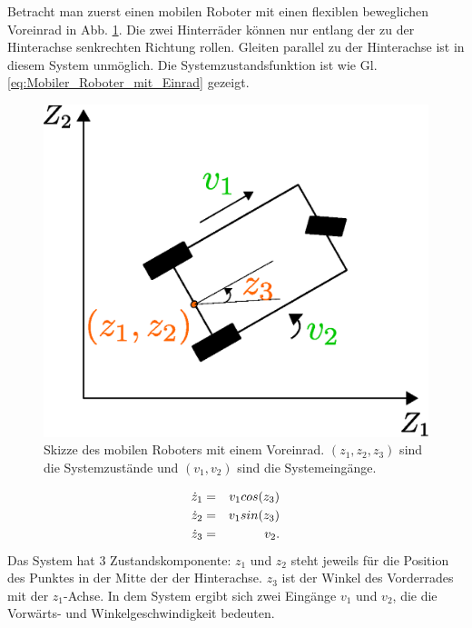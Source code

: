 \begin{beispiel}\label{bp:Brocketts_Doppelintegrator}
	Betracht man zuerst einen mobilen Roboter mit einen flexiblen beweglichen Voreinrad in Abb. \ref{fig:Brocketts_Doppelintegrator}. Die zwei Hinterräder können nur entlang der zu der Hinterachse senkrechten Richtung rollen. Gleiten parallel zu der Hinterachse ist in diesem System unmöglich. Die Systemzustandsfunktion ist wie Gl. \eqref{eq:Mobiler_Roboter_mit_Einrad} gezeigt.
	\begin{figure}[!h]
		\centering
		\includegraphics[width=0.4\linewidth]{bild/modul/Brocketts_Beispiel.eps}%
		\caption[Skizze des mobilen Roboters mit einem Voreinrad.]{Skizze des mobilen Roboters mit einem Voreinrad. $(z_{1}, z_{2},z_{3})$ sind die Systemzustände und $(v_{1},v_{2})$ sind die Systemeingänge.}
		\label{fig:Brocketts_Doppelintegrator}
	\end{figure}  
	\begin{eqnarray}
	\dot{z}_{1} &=& v_{1}cos(z_{3})\notag\\
	\dot{z}_{2} &=& v_{1}sin(z_{3})\notag\\
	\dot{z}_{3} &=& v_{2}.
	\label{eq:Mobiler_Roboter_mit_Einrad}
	\end{eqnarray} 
	Das System hat $3$ Zustandskomponente: $z_{1}$ und $z_{2}$ steht jeweils für die Position des Punktes in der Mitte der der Hinterachse. $z_{3}$ ist der Winkel des Vorderrades mit der $z_{1}$-Achse. In dem System ergibt sich zwei Eingänge $v_{1}$ und $v_{2}$, die die Vorwärts- und Winkelgeschwindigkeit bedeuten.


\end{beispiel}
